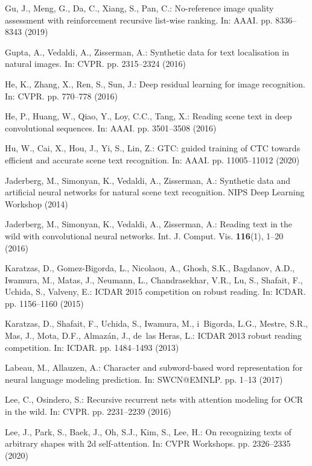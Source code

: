 \documentclass[runningheads]{llncs}
\begin{document}
\begin{thebibliography}{10}
Gu, J., Meng, G., Da, C., Xiang, S., Pan, C.: No-reference image quality
  assessment with reinforcement recursive list-wise ranking. In: AAAI. pp.
  8336--8343 (2019)

Gupta, A., Vedaldi, A., Zisserman, A.: Synthetic data for text localisation in
  natural images. In: CVPR. pp. 2315--2324 (2016)

He, K., Zhang, X., Ren, S., Sun, J.: Deep residual learning for image
  recognition. In: CVPR. pp. 770--778 (2016)

He, P., Huang, W., Qiao, Y., Loy, C.C., Tang, X.: Reading scene text in deep
  convolutional sequences. In: AAAI. pp. 3501--3508 (2016)

Hu, W., Cai, X., Hou, J., Yi, S., Lin, Z.: {GTC:} guided training of {CTC}
  towards efficient and accurate scene text recognition. In: AAAI. pp.
  11005--11012 (2020)

Jaderberg, M., Simonyan, K., Vedaldi, A., Zisserman, A.: Synthetic data and
  artificial neural networks for natural scene text recognition. NIPS Deep
  Learning Workshop  (2014)

Jaderberg, M., Simonyan, K., Vedaldi, A., Zisserman, A.: Reading text in the
  wild with convolutional neural networks. Int. J. Comput. Vis.
  \textbf{116}(1),  1--20 (2016)

Karatzas, D., Gomez{-}Bigorda, L., Nicolaou, A., Ghosh, S.K., Bagdanov, A.D.,
  Iwamura, M., Matas, J., Neumann, L., Chandrasekhar, V.R., Lu, S., Shafait,
  F., Uchida, S., Valveny, E.: {ICDAR} 2015 competition on robust reading. In:
  ICDAR. pp. 1156--1160 (2015)

Karatzas, D., Shafait, F., Uchida, S., Iwamura, M., i~Bigorda, L.G., Mestre,
  S.R., Mas, J., Mota, D.F., Almaz{\'{a}}n, J., de~las Heras, L.: {ICDAR} 2013
  robust reading competition. In: ICDAR. pp. 1484--1493 (2013)

Labeau, M., Allauzen, A.: Character and subword-based word representation for
  neural language modeling prediction. In: SWCN@EMNLP. pp. 1--13 (2017)

Lee, C., Osindero, S.: Recursive recurrent nets with attention modeling for
  {OCR} in the wild. In: CVPR. pp. 2231--2239 (2016)

Lee, J., Park, S., Baek, J., Oh, S.J., Kim, S., Lee, H.: On recognizing texts
  of arbitrary shapes with 2d self-attention. In: CVPR Workshops. pp.
  2326--2335 (2020)


\end{thebibliography}
\end{document}
